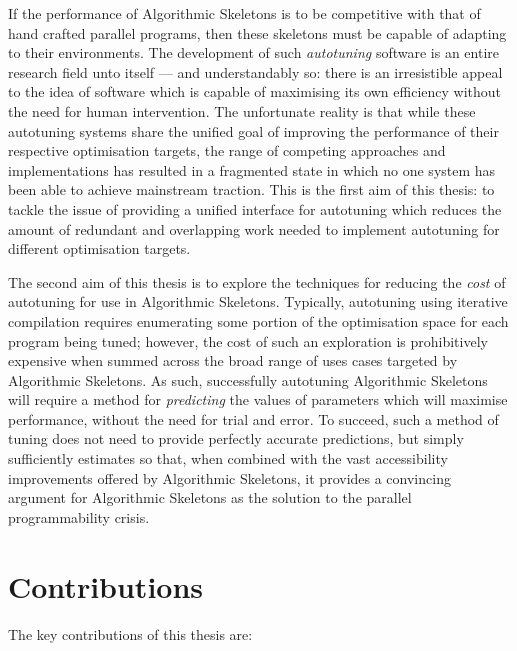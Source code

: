 
If the performance of Algorithmic Skeletons is to be competitive with
that of hand crafted parallel programs, then these skeletons must be
capable of adapting to their environments. The development of such
\emph{autotuning} software is an entire research field unto itself ---
and understandably so: there is an irresistible appeal to the idea of
software which is capable of maximising its own efficiency without the
need for human intervention. The unfortunate reality is that while
these autotuning systems share the unified goal of improving the
performance of their respective optimisation targets, the range of
competing approaches and implementations has resulted in a fragmented
state in which no one system has been able to achieve mainstream
traction. This is the first aim of this thesis: to tackle the issue of
providing a unified interface for autotuning which reduces the amount
of redundant and overlapping work needed to implement autotuning for
different optimisation targets.


The second aim of this thesis is to explore the techniques for
reducing the \emph{cost} of autotuning for use in Algorithmic
Skeletons. Typically, autotuning using iterative compilation requires
enumerating some portion of the optimisation space for each program
being tuned; however, the cost of such an exploration is prohibitively
expensive when summed across the broad range of uses cases targeted by
Algorithmic Skeletons. As such, successfully autotuning Algorithmic
Skeletons will require a method for \emph{predicting} the values of
parameters which will maximise performance, without the need for trial
and error. To succeed, such a method of tuning does not need to
provide perfectly accurate predictions, but simply sufficiently
estimates so that, when combined with the vast accessibility
improvements offered by Algorithmic Skeletons, it provides a
convincing argument for Algorithmic Skeletons as the solution to the
parallel programmability crisis.


\section{Contributions}

The key contributions of this thesis are:


